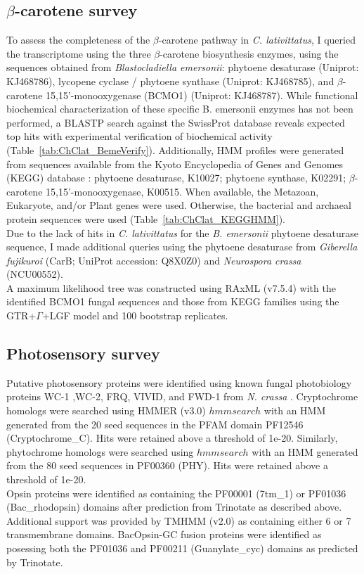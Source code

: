 \subsection*{$\beta$-carotene survey}
To assess the completeness of the $\beta$-carotene pathway in \textit{C. lativittatus}, I queried the transcriptome using the three $\beta$-carotene biosynthesis enzymes, using the sequences obtained from \textit{Blastocladiella emersonii}: phytoene desaturase (Uniprot: KJ468786), lycopene cyclase / phytoene synthase (Uniprot: KJ468785), and $\beta$-carotene 15,15'-monooxygenase (BCMO1) (Uniprot: KJ468787). While functional biochemical characterization of these specific B. emersonii enzymes has not been performed, a BLASTP search against the SwissProt database reveals expected top hits with experimental verification of biochemical activity (Table~\ref{tab:ChClat_BemeVerify}). Additionally, HMM profiles were generated from sequences available from the Kyoto Encyclopedia of Genes and Genomes (KEGG) database \cite{Kanehisa2000,Kanehisa2014}: phytoene desaturase, K10027; phytoene synthase, K02291; $\beta$-carotene 15,15'-monooxygenase, K00515. When available, the Metazoan, Eukaryote, and/or Plant genes were used. Otherwise, the bacterial and archaeal protein sequences were used (Table~\ref{tab:ChClat_KEGGHMM}).\\
\indent Due to the lack of hits in \textit{C. lativittatus} for the \textit{B. emersonii} phytoene desaturase sequence, I made additional queries using the phytoene desaturase from \textit{Giberella fujikuroi} (CarB; UniProt accession: Q8X0Z0) and \textit{Neurospora crassa} (NCU00552).\\
\indent A maximum likelihood tree was constructed using RAxML (v7.5.4) with the identified BCMO1 fungal sequences and those from KEGG families using the GTR+$\Gamma$+LGF model and 100 bootstrap replicates. \\

\subsection*{Photosensory survey}
Putative photosensory proteins were identified using known fungal photobiology proteins WC-1 ,WC-2, FRQ, VIVID, and FWD-1 from \textit{N. crassa} \cite{Borkovich2004}. Cryptochrome homologs were searched using HMMER (v3.0) $hmmsearch$ with an HMM generated from the 20 seed sequences in the PFAM domain PF12546 (Cryptochrome\_C). Hits were retained above a threshold of 1e-20. Similarly, phytochrome homologs were searched using $hmmsearch$ with an HMM generated from the 80 seed sequences in PF00360 (PHY). Hits were retained above a threshold of 1e-20. \\
\indent Opsin proteins were identified as containing the PF00001 (7tm\_1) or PF01036 (Bac\_rhodopsin) domains after prediction from Trinotate as described above. Additional support was provided by TMHMM (v2.0) as containing either 6 or 7 transmembrane domains. BacOpsin-GC fusion proteins were identified as posessing both the PF01036 and PF00211 (Guanylate\_cyc) domains as predicted by Trinotate.\\

